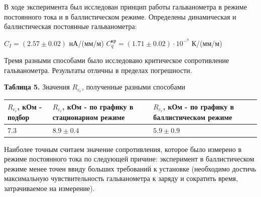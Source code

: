 \documentclass[a4paper]{article}
\begin{document}
В ходе эксперимента был исследован принцип работы гальванометра в режиме постоянного тока и в баллистическом режиме. Определены динамическая и баллистическая постоянные гальванометра:

\begin{center}
    $C_I = (2.57 \pm 0.02)$ нА/(мм/м) \hspace{1cm} $C_{q}^{\text{кр}} = (1.71 \pm 0.02) \cdot 10^-^9$ К/(мм/м)
\end{center}

Тремя разными способами было исследовано критическое сопротивление гальванометра. Результаты отличны в пределах погрешности.

\begin{table}[h]
    \centering
    \begin{center}
        \textbf{Таблица 5.} Значения $R_c_r$, полученные разными способами
    \end{center}
    \begin{tabular}{ |p{4cm}|p{4cm}|p{4cm}|}
    \hline
        $R_c_r$, кОм - подбор & $R_c_r$, кОм  - по графику в стационарном режиме & $R_c_r$, кОм - по графику в баллистическом режиме \\
    \hline
        $7.3$ & $8.9 \pm 0.4$ & $5.9 \pm 0.9$ \\
    \hline
    \end{tabular}
\end{table} 

Наиболее точным считаем значение сопротивления, которое было измерено в режиме постоянного тока по следующей причине: эксперимент в баллистическом режиме менее точен ввиду больших требований к установке (необходимо достичь максимальную чувствительность гальванометра к заряду и сократить время, затрачиваемое на измерение).
\end{document}
